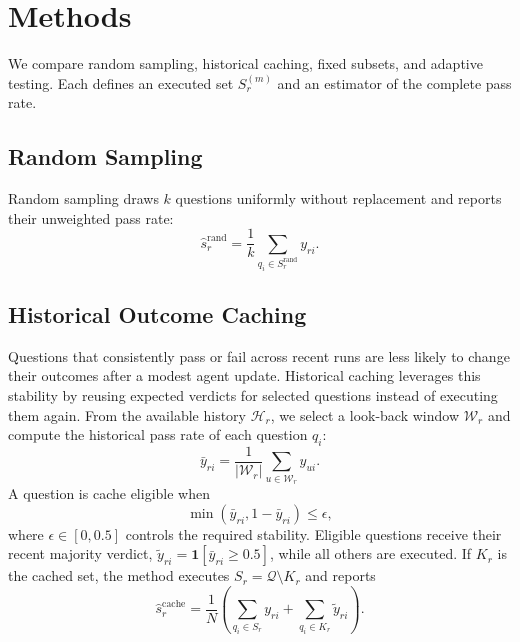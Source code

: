 \section{Methods}
\label{sec:methods}
We compare random sampling, historical caching, fixed subsets, and adaptive
testing. Each defines an executed set $S_r^{(m)}$ and an estimator of the
complete pass rate.


\subsection{Random Sampling}
\label{sec:method-random}

Random sampling draws $k$ questions uniformly without replacement and reports
their unweighted pass rate:
\begin{equation}
  \hat{s}_r^{\mathrm{rand}}
  = \frac{1}{k}\sum_{q_i\in S_r^{\mathrm{rand}}}y_{ri}.
\end{equation}

\subsection{Historical Outcome Caching}
\label{sec:method-cache}
Questions that consistently pass or fail across recent runs are less likely to change
their outcomes after a modest agent update.
Historical caching leverages this stability by reusing expected verdicts for selected questions instead of executing them again.
From the available history $\mathcal{H}_r$, we
select a look-back window $\mathcal{W}_r$ and compute the historical
pass rate of each question $q_i$:
\begin{equation}
  \bar{y}_{ri}
  = \frac{1}{|\mathcal{W}_r|}
    \sum_{u\in\mathcal{W}_r}y_{ui}.
\end{equation}
A question is cache eligible when
\begin{equation}\label{equation:cache-eligible}
  \min(\bar{y}_{ri},1-\bar{y}_{ri}) \leq \epsilon,
\end{equation}
where $\epsilon\in[0,0.5]$ controls the required stability. Eligible questions
receive their recent majority verdict,
$\tilde{y}_{ri}=\mathbf{1}[\bar{y}_{ri}\geq 0.5]$, while all others are executed.
If $K_r$ is the cached set, the method executes
$S_r=\mathcal{Q}\setminus K_r$ and reports
\begin{equation}
  \hat{s}_r^{\mathrm{cache}}
  = \frac{1}{N}\left(
      \sum_{q_i\in S_r}y_{ri}
      + \sum_{q_i\in K_r}\tilde{y}_{ri}
    \right).
\end{equation}


